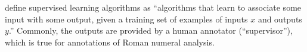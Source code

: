 


\textcite{goodfellow2016deep} define supervised learning algorithms as ``algorithms that learn to associate some input with some output, given a
training set of examples of inputs $x$ and outputs $y$.'' Commonly, the outputs are provided by a human annotator (``supervisor''), which is true for annotations of Roman numeral analysis.
